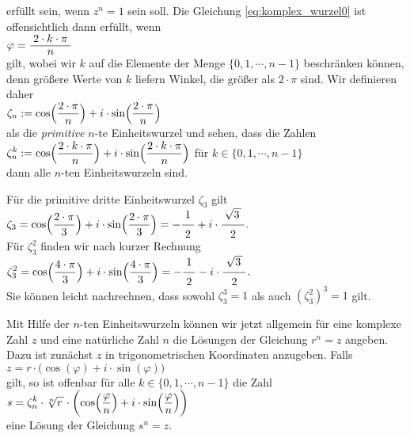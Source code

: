 erfüllt sein, wenn $z^n = 1$ sein soll.  Die Gleichung \ref{eq:komplex_wurzel0} ist offensichtlich dann
erfüllt, wenn 
\\[0.2cm]
\hspace*{1.3cm}
$\varphi = \bruch{2 \cdot k \cdot \pi}{n}$
\\[0.2cm]
gilt, wobei wir $k$ auf die Elemente der Menge $\{0,1, \cdots, n-1\}$ beschränken können, denn größere
Werte von $k$ liefern Winkel, die größer als $2 \cdot \pi$ sind.  Wir definieren daher
\\[0.2cm]
\hspace*{1.3cm}
$\displaystyle\zeta_n := \cos\Bigl(\frac{2 \cdot \pi}{n}\Bigr) + i \cdot \sin\Bigl(\frac{2 \cdot \pi}{n}\Bigr)$
\\[0.2cm]
als die \emph{primitive} $n$-te Einheitswurzel und sehen, dass die Zahlen
\\[0.2cm]
\hspace*{1.3cm}
$\displaystyle\zeta_n^k := \cos\Bigl(\frac{2 \cdot k \cdot \pi}{n}\Bigr) + i \cdot \sin\Bigl(\frac{2 \cdot k \cdot \pi}{n}\Bigr)$
\quad für $k \in \{ 0, 1, \cdots, n-1 \}$
\\[0.2cm]
dann alle $n$-ten Einheitswurzeln sind.

\example
Für die primitive dritte Einheitswurzel $\zeta_3$ gilt
\\[0.2cm]
\hspace*{1.3cm}
$\ds\zeta_3 = \cos\Bigl(\frac{2 \cdot \pi}{3}\Bigr) + i \cdot \sin\Bigl(\frac{2 \cdot \pi}{3}\Bigr)
 = - \bruch{1}{2} + i \cdot \bruch{\sqrt{3\,}}{2}. 
$
\\[0.2cm] 
Für $\zeta_3^2$ finden wir nach kurzer Rechnung
\\[0.2cm]
\hspace*{1.3cm}
$\ds\zeta_3^2 = \cos\Bigl(\frac{4 \cdot \pi}{3}\Bigr) + i \cdot \sin\Bigl(\frac{4 \cdot \pi}{3}\Bigr)
 = - \bruch{1}{2} - i \cdot \bruch{\sqrt{3\,}}{2}. 
$
\\[0.2cm]
Sie können leicht nachrechnen, dass sowohl $\zeta_3^3 = 1$ als auch $(\zeta_3^2)^3 = 1$ gilt.
\vspace*{0.2cm}

Mit Hilfe der $n$-ten Einheitswurzeln können wir jetzt allgemein für eine komplexe Zahl $z$ und eine
natürliche Zahl $n$ die Lösungen der Gleichung $r^n = z$ angeben.  Dazu ist zunächst $z$ in
trigonometrischen Koordinaten anzugeben.  Falls
\\[0.2cm]
\hspace*{1.3cm}
$z = r \cdot \bigl(\cos(\varphi) + i \cdot \sin(\varphi)\bigr)$
\\[0.2cm]
gilt, so ist offenbar für alle $k \in \{ 0, 1, \cdots, n - 1 \}$ die Zahl
\\[0.2cm]
\hspace*{1.3cm}
$\displaystyle s = \zeta_n^k \cdot \sqrt[n]{r\,} \cdot 
     \biggl(\cos\Bigl(\frac{\varphi}{n}\Bigr) + i \cdot \sin\Bigl(\frac{\varphi}{n}\Bigr) \biggr)
$
\\[0.2cm] 
eine Lösung der Gleichung $s^n = z$.

